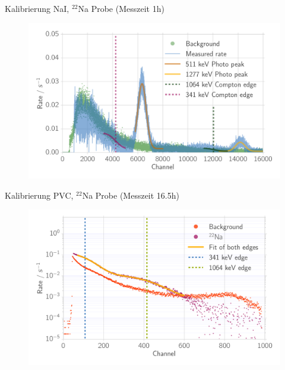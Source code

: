 \documentclass[xcolor=x11names,compress]{beamer}
\renewcommand{\(}{\begin{columns}}
\renewcommand{\)}{\end{columns}}
\newcommand{\<}[1]{\begin{column}{#1}}
\renewcommand{\>}{\end{column}}
\begin{document}
\begin{frame}[t]{Kalibrierung NaI, $^{22}$Na Probe (Messzeit 1h) }
\begin{figure}[htpb]
    \centering
    \includegraphics[width=1.0\linewidth]{../analysis/figures/histo_na_22na}
\label{fig:histo_na_22na}
\end{figure}
\end{frame}

\begin{frame}[t]{Kalibrierung PVC, $^{22}$Na Probe (Messzeit 16.5h) }
\begin{figure}[htpb]
    \centering
    \includegraphics[width=1.0\linewidth]{../analysis/figures/calib_ps_na}
\label{fig:calib_ps_na}
\end{figure}
\end{frame}
\end{document}
